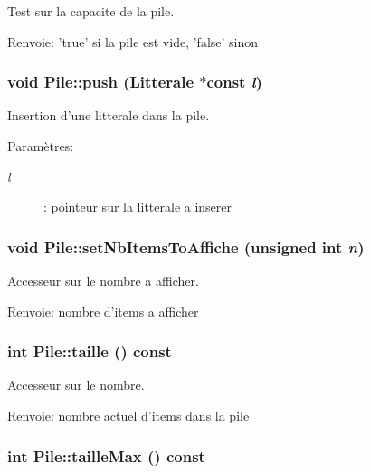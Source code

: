 Test sur la capacite de la pile. 

\begin{Desc}
\item[Renvoie:]'true' si la pile est vide, 'false' sinon \end{Desc}
\hypertarget{class_pile_c61f214686f5c75fc71fc86ce8da53e0}{
\subsubsection[{push}]{\setlength{\rightskip}{0pt plus 5cm}void Pile::push ({\bf Litterale} $\ast$const  {\em l})}}
\label{class_pile_c61f214686f5c75fc71fc86ce8da53e0}


Insertion d'une litterale dans la pile. 

\begin{Desc}
\item[Paramètres:]
\begin{description}
\item[{\em l}]: pointeur sur la litterale a inserer \end{description}
\end{Desc}
\hypertarget{class_pile_a61a682bdd3b9dac5d1b25e481c453d1}{
\subsubsection[{setNbItemsToAffiche}]{\setlength{\rightskip}{0pt plus 5cm}void Pile::setNbItemsToAffiche (unsigned int {\em n})}}
\label{class_pile_a61a682bdd3b9dac5d1b25e481c453d1}


Accesseur sur le nombre a afficher. 

\begin{Desc}
\item[Renvoie:]nombre d'items a afficher \end{Desc}
\hypertarget{class_pile_5d004688a405e8588c46336aa9cac0d9}{
\subsubsection[{taille}]{\setlength{\rightskip}{0pt plus 5cm}int Pile::taille () const}}
\label{class_pile_5d004688a405e8588c46336aa9cac0d9}


Accesseur sur le nombre. 

\begin{Desc}
\item[Renvoie:]nombre actuel d'items dans la pile \end{Desc}
\hypertarget{class_pile_b6c6dc3469f0ab644c5813f81f15b6dc}{
\subsubsection[{tailleMax}]{\setlength{\rightskip}{0pt plus 5cm}int Pile::tailleMax () const}}
\label{class_pile_b6c6dc3469f0ab644c5813f81f15b6dc}


